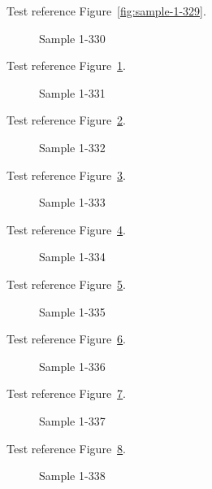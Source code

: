 Test reference Figure~\ref{fig:sample-1-329}.

\begin{figure}[tbhp]
\caption{Sample 1-330}
\label{fig:sample-1-330}
\end{figure}

Test reference Figure~\ref{fig:sample-1-330}.

\begin{figure}[tbhp]
\caption{Sample 1-331}
\label{fig:sample-1-331}
\end{figure}

Test reference Figure~\ref{fig:sample-1-331}.

\begin{figure}[tbhp]
\caption{Sample 1-332}
\label{fig:sample-1-332}
\end{figure}

Test reference Figure~\ref{fig:sample-1-332}.

\begin{figure}[tbhp]
\caption{Sample 1-333}
\label{fig:sample-1-333}
\end{figure}

Test reference Figure~\ref{fig:sample-1-333}.

\begin{figure}[tbhp]
\caption{Sample 1-334}
\label{fig:sample-1-334}
\end{figure}

Test reference Figure~\ref{fig:sample-1-334}.

\begin{figure}[tbhp]
\caption{Sample 1-335}
\label{fig:sample-1-335}
\end{figure}

Test reference Figure~\ref{fig:sample-1-335}.

\begin{figure}[tbhp]
\caption{Sample 1-336}
\label{fig:sample-1-336}
\end{figure}

Test reference Figure~\ref{fig:sample-1-336}.

\begin{figure}[tbhp]
\caption{Sample 1-337}
\label{fig:sample-1-337}
\end{figure}

Test reference Figure~\ref{fig:sample-1-337}.

\begin{figure}[tbhp]
\caption{Sample 1-338}
\label{fig:sample-1-338}
\end{figure}

